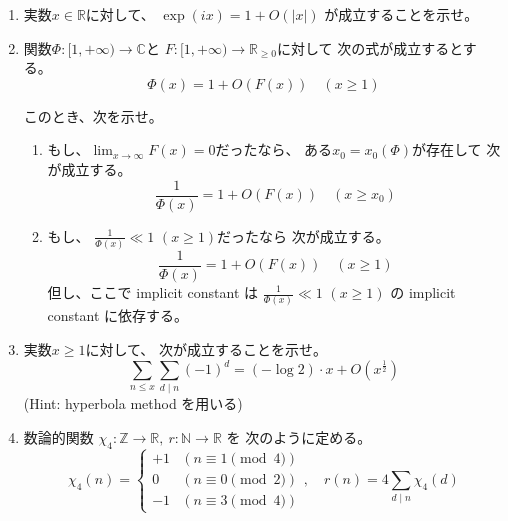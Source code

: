 \documentclass[12pt,b5paper]{ltjsarticle}
\begin{document}
\begin{enumerate}
\begin{enumerate}
      \end{enumerate}


 \item
      実数$x\in\mathbb{R}$に対して、
      $\exp(ix) = 1+O(\lvert x \rvert)$
      が成立することを示せ。


 \item
      関数$\Phi:[1,+\infty)\to\mathbb{C}$と
      $F:[1,+\infty)\to\mathbb{R}_{\geq 0}$に対して
      次の式が成立するとする。
      \begin{equation}
       \Phi(x) = 1+ O(F(x)) \quad (x\geq 1)
      \end{equation}
      
      このとき、次を示せ。
      \begin{enumerate}
       \item
            もし、$\lim_{x\to\infty}F(x)=0$だったなら、
            ある$x_{0}=x_{0}(\Phi)$が存在して
            次が成立する。
            \begin{equation}
             \frac{1}{\Phi(x)}= 1+ O(F(x)) \quad (x\geq x_{0})
            \end{equation}


       \item
            もし、
            $\frac{1}{\Phi(x)} \ll 1$ $(x\geq 1)$だったなら
            次が成立する。
            \begin{equation}
             \frac{1}{\Phi(x)}= 1+ O(F(x)) \quad (x\geq 1)
            \end{equation}
            但し、ここで implicit constant は
            $\frac{1}{\Phi(x)} \ll 1$ $(x\geq 1)$
            の implicit constant に依存する。


      \end{enumerate}


 \item
      実数$x\geq 1$に対して、
      次が成立することを示せ。
      \begin{equation}
       \sum_{n\leq x} \sum_{d \mid n}(-1)^{d}
        = (-\log{2})\cdot x + O(x^{\frac{1}{2}})
      \end{equation}
      (Hint: hyperbola method を用いる)



 \item
      数論的関数
      $\chi_{4} : \mathbb{Z}\to\mathbb{R}
      ,\ 
      r:\mathbb{N}\to\mathbb{R}$
      を
      次のように定める。
      \begin{equation}
       \chi_{4}(n) =
        \begin{cases}
         +1 & ( n\equiv 1 \pmod{4})\\
         0 & ( n\equiv 0 \pmod{2})\\
         -1 & ( n\equiv 3 \pmod{4})
        \end{cases}
        ,\quad
        r(n)=4\sum_{d\mid n} \chi_{4}(d)
      \end{equation}


\end{enumerate}
\end{document}
